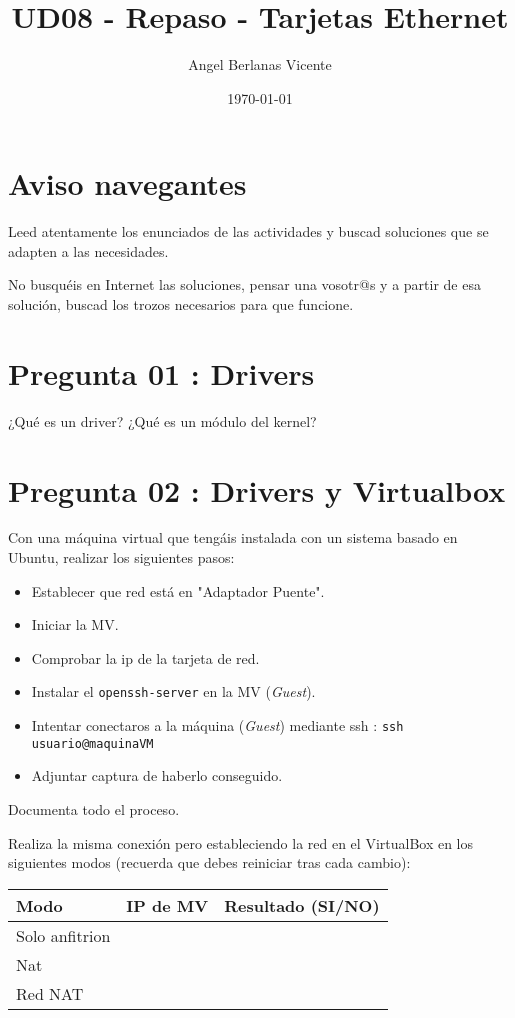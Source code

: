 \documentclass[11pt]{article}
\author{Angel Berlanas Vicente}
\date{\today}
\title{UD08 - Repaso - Tarjetas Ethernet}
\begin{document}
\maketitle
\tableofcontents


\section{Aviso navegantes}
\label{sec:orgf24394d}

Leed atentamente los enunciados de las actividades y buscad soluciones que se
adapten a las necesidades.

No busquéis en Internet las soluciones, pensar una vosotr@s y a partir de esa
solución, buscad los trozos necesarios para que funcione.

\section{Pregunta 01 : Drivers}
\label{sec:org234b664}

¿Qué es un driver? ¿Qué es un módulo del kernel?

\section{Pregunta 02 : Drivers y Virtualbox}
\label{sec:org0ae213d}

Con una máquina virtual que tengáis instalada con un sistema basado en Ubuntu,
realizar los siguientes pasos:

\begin{itemize}
\item Establecer que red está en "Adaptador Puente".
\item Iniciar la MV.
\item Comprobar la ip de la tarjeta de red.
\item Instalar el \texttt{openssh-server} en la MV (\emph{Guest}).
\item Intentar conectaros a la máquina (\emph{Guest}) mediante ssh : \texttt{ssh
    usuario@maquinaVM}
\item Adjuntar captura de haberlo conseguido.
\end{itemize}

Documenta todo el proceso.

Realiza la misma conexión pero estableciendo la red en el VirtualBox en los
siguientes modos (recuerda que debes reiniciar tras cada cambio):

\begin{center}
\begin{tabular}{lll}
Modo & IP de MV & Resultado (SI/NO)\\
\hline
Solo anfitrion &  & \\
Nat &  & \\
Red NAT &  & \\
\end{tabular}
\end{center}
\end{document}
